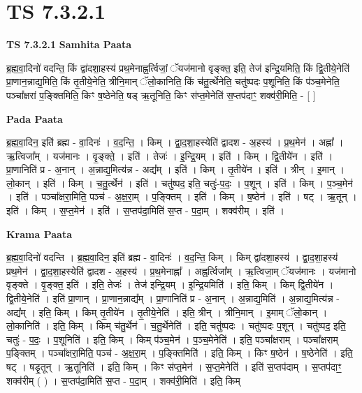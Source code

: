 \documentclass[17pt]{extarticle}
\begin{document}
\section{ TS 7.3.2.1 }

\textbf{TS 7.3.2.1 } \newline
\textbf{Samhita Paata} \newline

ब्र॒ह्म॒वा॒दिनो॑ वदन्ति॒ किं द्वा॑दशा॒हस्य॑ प्रथ॒मेनाह्न॒र्त्विजां॒ ॅयज॑मानो वृङ्क्त॒ इति॒ तेज॑ इन्द्रि॒यमिति॒ किं द्वि॒तीये॒नेति॑ प्रा॒णान॒न्नाद्य॒मिति॒ किं तृ॒तीये॒नेति॒ त्रीनि॒मान् ॅलो॒कानिति॒ किं च॑तु॒र्त्थेनेति॒ चतु॑ष्पदः प॒शूनिति॒ किं प॑ञ्च॒मेनेति॒ पञ्चा᳚क्षरां प॒ङ्क्तिमिति॒ किꣳ ष॒ष्ठेनेति॒ षड् ऋ॒तूनिति॒ किꣳ स॑प्त॒मेनेति॑ स॒प्तप॑दाꣳ॒॒ शक्व॑री॒मिति॒ - [  ] \newline

\textbf{Pada Paata} \newline

ब्र॒ह्म॒वा॒दिन॒ इति॑ ब्रह्म - वा॒दिनः॑ । व॒द॒न्ति॒ । किम् । द्वा॒द॒शा॒हस्येति॑ द्वादश - अ॒हस्य॑ । प्र॒थ॒मेन॑ । अह्ना᳚ । ऋ॒त्विजा᳚म् । यज॑मानः । वृ॒ङ्क्ते॒ । इति॑ । तेजः॑ । इ॒न्द्रि॒यम् । इति॑ । किम् । द्वि॒तीये॑न । इति॑ । प्रा॒णानिति॑ प्र - अ॒नान् । अ॒न्नाद्य॒मित्य॑न्न - अद्य᳚म् । इति॑ । किम् । तृ॒तीये॑न । इति॑ । त्रीन् । इ॒मान् । लो॒कान् । इति॑ । किम् । च॒तु॒र्त्थेन॑ । इति॑ । चतु॑ष्पद॒ इति॒ चतुः॑-प॒दः॒ । प॒शून् । इति॑ । किम् । प॒ञ्च॒मेन॑ । इति॑ । पञ्चा᳚क्षरा॒मिति॒ पञ्च॑ - अ॒क्ष॒रा॒म् । प॒ङ्क्तिम् । इति॑ । किम् । ष॒ष्ठेन॑ । इति॑ । षट् । ऋ॒तून् । इति॑ । किम् । स॒प्त॒मेन॑ । इति॑ । स॒प्तप॑दा॒मिति॑ स॒प्त - प॒दा॒म् । शक्व॑रीम् । इति॑ ।  \newline


\textbf{Krama Paata} \newline

ब्र॒ह्म॒वा॒दिनो॑ वदन्ति । ब्र॒ह्म॒वा॒दिन॒ इति॑ ब्रह्म - वा॒दिनः॑ । व॒द॒न्ति॒ किम् । किम् द्वा॑दशा॒हस्य॑ । द्वा॒द॒शा॒हस्य॑ प्रथ॒मेन॑ । द्वा॒द॒शा॒हस्येति॑ द्वादश - अ॒हस्य॑ । प्र॒थ॒मेनाह्ना᳚ । अह्न॒र्त्विजा᳚म् । ऋ॒त्विजा॒म् ॅयज॑मानः । यज॑मानो वृङ्‍क्ते । वृ॒ङ्‍क्त॒ इति॑ । इति॒ तेजः॑ । तेज॑ इन्द्रि॒यम् । इ॒न्द्रि॒यमिति॑ । इति॒ किम् । किम् द्वि॒तीये॑न । द्वि॒तीये॒नेति॑ । इति॑ प्रा॒णान् । प्रा॒णान॒न्नाद्य᳚म् । प्रा॒णानिति॑ प्र - अ॒नान् । अ॒न्नाद्य॒मिति॑ । अ॒न्नाद्य॒मित्य॑न्न - अद्य᳚म् । इति॒ किम् । किम् तृ॒तीये॑न । तृ॒तीये॒नेति॑ । इति॒ त्रीन् । त्रीनि॒मान् । इ॒माम् ॅलो॒कान् । लो॒कानिति॑ । इति॒ किम् । किम् च॑तु॒र्थेन॑ । च॒तु॒र्थेनेति॑ । इति॒ चतु॑ष्पदः । चतु॑ष्पदः प॒शून् । चतु॑ष्पद॒ इति॒ चतुः॑ - प॒दः॒ । प॒शूनिति॑ । इति॒ किम् । किम् प॑ञ्च॒मेन॑ । प॒ञ्च॒मेनेति॑ । इति॒ पञ्चा᳚क्षराम् । पञ्चा᳚क्षराम् प॒ङ्‍क्तिम् । पञ्चा᳚क्षरा॒मिति॒ पञ्च॑ - अ॒क्ष॒रा॒म् । प॒ङ्‍क्तिमिति॑ । इति॒ किम् । किꣳ ष॒ष्ठेन॑ । ष॒ष्ठेनेति॑ । इति॒ षट् । षडृ॒तून् । ऋ॒तूनिति॑ । इति॒ किम् । किꣳ स॑प्त॒मेन॑ । स॒प्त॒मेनेति॑ । इति॑ स॒प्तप॑दाम् । स॒प्तप॑दाꣳ॒॒ शक्व॑रीम् ( ) । स॒प्तप॑दा॒मिति॑ स॒प्त - प॒दा॒म् । शक्व॑री॒मिति॑ । इति॒ किम् \newline
\end{document}
